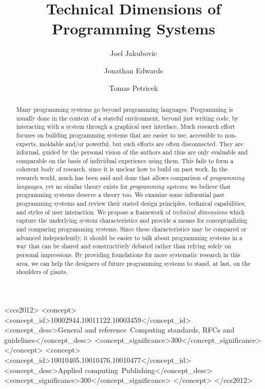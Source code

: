 \documentclass[english,submission]{programming}
\begin{document}

\title{Technical Dimensions of Programming Systems}

\author{Joel Jakubovic}
\author{Jonathan Edwards}
\author{Tomas Petricek}


\begin{CCSXML}
<ccs2012>
<concept>
<concept_id>10002944.10011122.10003459</concept_id>
<concept_desc>General and reference~Computing standards, RFCs and guidelines</concept_desc>
<concept_significance>300</concept_significance>
</concept>
<concept>
<concept_id>10010405.10010476.10010477</concept_id>
<concept_desc>Applied computing~Publishing</concept_desc>
<concept_significance>300</concept_significance>
</concept>
</ccs2012>
\end{CCSXML}

\maketitle

\begin{abstract}
Many programming systems go beyond programming languages. Programming is usually done in the context of a stateful environment, beyond just writing code, by interacting with a system through a graphical user interface. Much research effort focuses on building programming systems that are easier to use, accessible to non-experts, moldable and/or powerful, but such efforts are often disconnected. They are informal, guided by the personal vision of the authors and thus are only evaluable and comparable on the basis of individual experience using them. This fails to form a coherent body of research, since it is unclear how to build on past work. In the research world, much has been said and done that allows comparison of \emph{programming languages}, yet no similar theory exists for \emph{programming systems}; we believe that programming systems deserve a theory too. We examine some influential past programming systems and review their stated design principles, technical capabilities, and styles of user interaction. We propose a framework of \emph{technical dimensions} which capture the underlying system characteristics and provide a means for conceptualizing and comparing programming systems. Since these characteristics may be compared or advanced independently, it should be easier to talk about programming systems in a way that can be shared and constructively debated rather than relying solely on personal impressions. By providing foundations for more systematic research in this area, we can help the designers of future programming systems to stand, at last, on the shoulders of giants.
\end{abstract}
\end{document}
